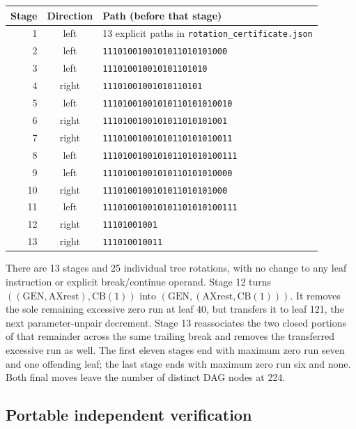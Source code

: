 \begin{center}
\begin{tabular}{rcl}
Stage&Direction&Path (before that stage)\\\hline
1&left&13 explicit paths in \texttt{rotation\_certificate.json}\\
2&left&\texttt{1110100100101011010101000}\\
3&left&\texttt{111010010010101101010}\\
4&right&\texttt{11101001001010110101}\\
5&left&\texttt{11101001001010110101010010}\\
6&right&\texttt{1110100100101011010101001}\\
7&right&\texttt{11101001001010110101010011}\\
8&left&\texttt{111010010010101101010100111}\\
9&left&\texttt{11101001001010110101010000}\\
10&right&\texttt{1110100100101011010101000}\\
11&left&\texttt{111010010010101101010100111}\\
12&right&\texttt{11101001001}\\
13&right&\texttt{111010010011}
\end{tabular}
\end{center}

There are 13 stages and 25 individual tree rotations, with no change to
any leaf instruction or explicit break/continue operand.  Stage 12 turns
$((\mathrm{GEN},\mathrm{AXrest}),\mathrm{CB}(1))$ into
$(\mathrm{GEN},(\mathrm{AXrest},\mathrm{CB}(1)))$.  It removes the sole
remaining excessive zero run at leaf 40, but transfers it to leaf 121,
the next parameter-unpair decrement.  Stage 13 reassociates the two
closed portions of that remainder across the same trailing break and
removes the transferred excessive run as well.  The first eleven stages
end with maximum zero run seven and one offending leaf; the last stage
ends with maximum zero run six and none.  Both final moves leave the
number of distinct DAG nodes at 224.

\subsection{Portable independent verification}

